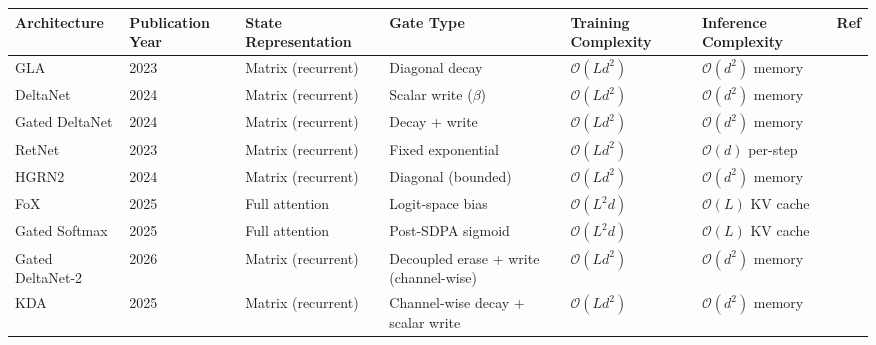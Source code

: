 \footnotesize
\begin{longtable}{p{1.8cm}p{1.7cm}p{1.8cm}p{1.6cm}p{2.0cm}p{2.4cm}p{1.3cm}}
\toprule
\textbf{Architecture} & \textbf{Publication Year} & \textbf{State Representation} & \textbf{Gate Type} & \textbf{Training Complexity} & \textbf{Inference Complexity} & \textbf{Ref} \\
\midrule
\endhead
GLA & 2023 & Matrix (recurrent) & Diagonal decay & $\mathcal{O}(Ld^2)$ & $\mathcal{O}(d^2)$ memory & \citep{yang_gla_2023} \\
DeltaNet & 2024 & Matrix (recurrent) & Scalar write ($\beta$) & $\mathcal{O}(Ld^2)$ & $\mathcal{O}(d^2)$ memory & \citep{yang_deltanet_2024} \\
Gated DeltaNet & 2024 & Matrix (recurrent) & Decay + write & $\mathcal{O}(Ld^2)$ & $\mathcal{O}(d^2)$ memory & \citep{yang_gated_deltanet_2024} \\
RetNet & 2023 & Matrix (recurrent) & Fixed exponential & $\mathcal{O}(Ld^2)$ & $\mathcal{O}(d)$ per-step & \citep{sun_retentive_2023} \\
HGRN2 & 2024 & Matrix (recurrent) & Diagonal (bounded) & $\mathcal{O}(Ld^2)$ & $\mathcal{O}(d^2)$ memory & \citep{qin_hgrn2_2024} \\
FoX & 2025 & Full attention & Logit-space bias & $\mathcal{O}(L^2d)$ & $\mathcal{O}(L)$ KV cache & \citep{lin_forgetting_transformer_2025} \\
Gated Softmax & 2025 & Full attention & Post-SDPA sigmoid & $\mathcal{O}(L^2d)$ & $\mathcal{O}(L)$ KV cache & \citep{qiu_gated_attention_2025} \\
Gated DeltaNet-2 & 2026 & Matrix (recurrent) & Decoupled erase + write (channel-wise) & $\mathcal{O}(Ld^2)$ & $\mathcal{O}(d^2)$ memory & \citep{hatamizadeh_gated_deltanet2_2026} \\
KDA & 2025 & Matrix (recurrent) & Channel-wise decay + scalar write & $\mathcal{O}(Ld^2)$ & $\mathcal{O}(d^2)$ memory & \citep{kimi_kda_2025} \\
\bottomrule
\end{longtable}
\normalsize

\medskip


